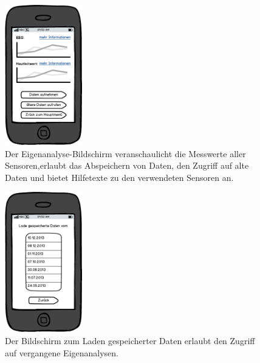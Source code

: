 \documentclass[10pt, a4paper, oneside, titlepage]{scrartcl} %
\begin{document}
	\begin{figure}[ht!]
		\begin{center}
			\includegraphics[width=0.3\textwidth]{mockup_09_selfanalysis.png}
		\end{center}
		\caption[Mockup Bildschirm Eigenanalyse]{Der Eigenanalyse-Bildschirm veranschaulicht die Messwerte aller Sensoren,erlaubt das Abspeichern von Daten, den Zugriff auf alte Daten und bietet Hilfetexte zu den verwendeten Sensoren an.}
		\label{fig:mockup_09}
	\end{figure}	

	\begin{figure}[ht!]
		\begin{center}
			\includegraphics[width=0.3\textwidth]{mockup_10_saveddata.png}
		\end{center}
		\caption[Mockup Bildschirm zum Laden gespeicherter Daten]{Der Bildschirm zum Laden gespeicherter Daten erlaubt den Zugriff auf vergangene Eigenanalysen.}
		\label{fig:mockup_10}
	\end{figure}	
	
\end{document}
